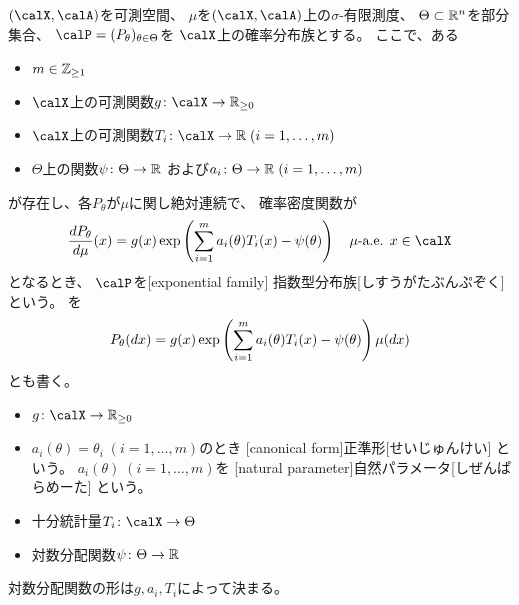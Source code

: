 \documentclass[report]{jlreq}
\begin{document}
\begin{definition}[指数型分布族]
    $(\calX, \calA)$を可測空間、
    $\mu$を$(\calX, \calA)$上の$\sigma$-有限測度、
    $\Theta \subset \mathbb{R}^n$を部分集合、
    $\calP = (P_\theta)_{\theta \in \Theta}$を
    $\calX$上の確率分布族とする。
    ここで、ある
    \begin{itemize}
        \item $m \in \mathbb{Z}_{\ge 1}$
        \item $\calX$上の可測関数$g \colon \calX \to \R_{\ge 0}$
        \item $\calX$上の可測関数$T_i \colon \calX \to \R \; (i = 1, \dots, m)$
        \item $\Theta$上の関数$\psi \colon \Theta \to \mathbb{R}$
            および$a_i \colon \Theta \to \mathbb{R} \; (i = 1, \dots, m)$
    \end{itemize}
    が存在し、各$P_\theta$が$\mu$に関し絶対連続で、
    確率密度関数が
    \begin{equation}
        \locallabel{eq:expfam}
        \frac{dP_\theta}{d\mu}(x)
            = g(x) \exp\myparen{
                \sum_{i = 1}^m a_i(\theta) T_i(x)
                - \psi(\theta)
            }
            \quad
            \text{$\mu$-a.e. $x \in \calX$}
    \end{equation}
    となるとき、
    $\calP$を[exponential family]
        {指数型分布族}[しすうがたぶんぷぞく]
    という。
    を
    \begin{equation}
        P_\theta(dx) = g(x) \exp\left({
            \sum_{i = 1}^m a_i(\theta) T_i(x)
            - \psi(\theta)
        }\right) \mu(dx)
    \end{equation}
    とも書く。
    \begin{itemize}
        \item $g \colon \calX \to \R_{\ge 0}$
        \item $a_i(\theta) = \theta_i \; (i = 1, \dots, m)$のとき
            [canonical form]{正準形}[せいじゅんけい]
            という。
            $a_i(\theta) \; (i = 1, \dots, m)$を
            [natural parameter]{自然パラメータ}[しぜんぱらめーた]
            という。
        \item 十分統計量$T_i \colon \calX \to \Theta$
        \item 対数分配関数$\psi \colon \Theta \to \mathbb{R}$
    \end{itemize}
\end{definition}

対数分配関数の形は$g, a_i, T_i$によって決まる。
\end{document}
